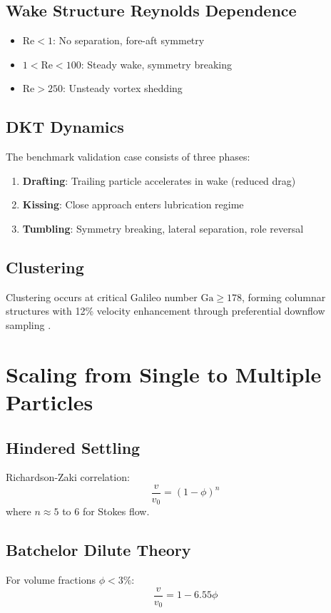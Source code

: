 \subsection{Wake Structure Reynolds Dependence}
\begin{itemize}
    \item $\text{Re} < 1$: No separation, fore-aft symmetry
    \item $1 < \text{Re} < 100$: Steady wake, symmetry breaking
    \item $\text{Re} > 250$: Unsteady vortex shedding
\end{itemize}

\subsection{DKT Dynamics}
The benchmark validation case consists of three phases:
\begin{enumerate}
    \item \textbf{Drafting}: Trailing particle accelerates in wake (reduced drag)
    \item \textbf{Kissing}: Close approach enters lubrication regime
    \item \textbf{Tumbling}: Symmetry breaking, lateral separation, role reversal
\end{enumerate}

\subsection{Clustering}
Clustering occurs at critical Galileo number $\text{Ga} \geq 178$, forming columnar structures with 12\% velocity enhancement through preferential downflow sampling \cite{uhlmann2014,liu2021}.

\section{Scaling from Single to Multiple Particles}

\subsection{Hindered Settling}
Richardson-Zaki correlation:
\begin{equation}
\frac{v}{v_0} = (1-\phi)^n
\end{equation}
where $n \approx 5$ to 6 for Stokes flow.

\subsection{Batchelor Dilute Theory}
For volume fractions $\phi < 3\%$:
\begin{equation}
\frac{v}{v_0} = 1 - 6.55\phi
\end{equation}

